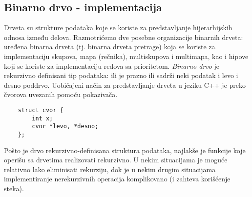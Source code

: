 \documentclass{article}
\begin{document}
\subsection{Binarno drvo - implementacija}
Drveta su strukture podataka koje se koriste za predstavljanje hijerarhijskih
odnosa između delova. Razmotrićemo
dve posebne organizacije binarnih drveta: uređena binarna drveta (tj. binarna
drveta pretrage) koja se koriste za implementaciju skupova, mapa (rečnika),
multiskupova i multimapa, kao i hipove koji se koriste za implementaciju redova
sa prioritetom.
\newline \textit{Binarno drvo} je rekurzivno definisani tip podataka: ili je prazno ili sadrži neki
podatak i levo i desno poddrvo. Uobičajeni način za predstavljanje drveta u jeziku C++ je preko čvorova uvezanih
pomoću pokazivača.
\begin{lstlisting}
    struct cvor {
        int x;
        cvor *levo, *desno;
    };
\end{lstlisting}
Pošto je drvo rekurzivno-definisana struktura podataka, najlakše je funkcije
koje operišu sa drvetima realizovati rekurzivno. U nekim situacijama je moguće
relativno lako eliminisati rekurziju, dok je u nekim drugim situacijama implementiranje nerekurzivnih operacija komplikovano (i zahteva korišćenje steka).
\end{document}
